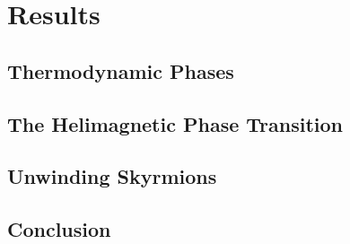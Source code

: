 %
\chapter{Results}\label{chap:2}
%
%
\section{Thermodynamic Phases}\label{sec:phases}
%
%
\section{The Helimagnetic Phase Transition}\label{sec:details}
%
%
\section{Unwinding Skyrmions}\label{sec:transitions}
%
%
\section{Conclusion}\label{sec:conclusion}
%
